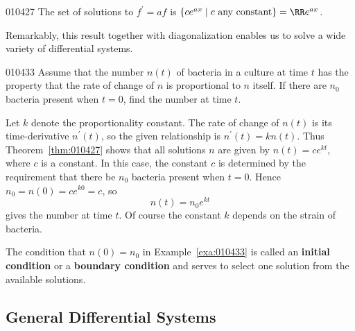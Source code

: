 \begin{theorem}{}{010427}
The set of solutions to $f^{\prime}= af$ is $\{ce^{ax} \mid  c \mbox{ any constant}\} = \RR e^{ax}$.
\end{theorem}

\noindent Remarkably, this result together with diagonalization enables us to solve a wide variety of differential systems.


\begin{example}{}{010433}
Assume that the number $n(t)$ of bacteria in a culture at time $t$ has the property that the rate of change of $n$ is proportional to $n$ itself. If there are $n_{0}$ bacteria present when $t = 0$, find the number at time $t$.


\begin{solution}
  Let $k$ denote the proportionality constant. The rate of change of $n(t)$ is its time-derivative $n^{\prime}(t)$, so the given relationship is $n^{\prime}(t) = kn(t)$. Thus Theorem~\ref{thm:010427} shows that all solutions $n$ are given by $n(t) = ce^{kt}$, where $c$ is a constant. In this case, the constant $c$ is determined by the requirement that there be $n_{0}$ bacteria present when $t = 0$. Hence $n_{0} = n(0) = ce^{k0} = c$, so
\begin{equation*}
n(t) = n_0 e^{kt}
\end{equation*}
gives the number at time $t$. Of course the constant $k$ depends on the strain of bacteria.
\end{solution}
\end{example}

The condition that $n(0) = n_{0}$ in Example~\ref{exa:010433} is called an \textbf{initial condition} or a \textbf{boundary condition} and serves to select one solution from the available solutions.


\subsection*{General Differential Systems}

